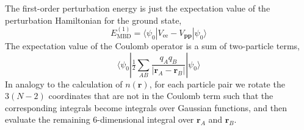 The first-order perturbation energy is just the expectation value of the perturbation Hamiltonian for the ground state,
\begin{equation}
E^{(1)}_\text{MBD}=\langle\psi_0|V_\text{ee}-V_{\mathbf{pp}}|\psi_0\rangle
\end{equation}
The expectation value of the Coulomb operator is a sum of two-particle terms,
\begin{equation}
\langle\psi_0|\tfrac12\sum_{AB}\frac{q_A q_B}{\lvert\mathbf r_A-\mathbf r_B\rvert}|\psi_0\rangle
\end{equation}
In analogy to the calculation of $n(\mathbf r)$, for each particle pair we rotate the $3(N-2)$ coordinates that are not in the Coulomb term such that the corresponding integrals become integrals over Gaussian functions, and then evaluate the remaining 6-dimensional integral over $\mathbf r_A$ and $\mathbf r_B$.

